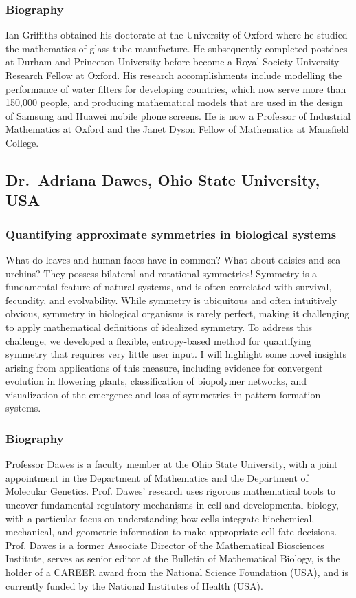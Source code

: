 \documentclass[12pt,a4paper]{article}
\begin{document}
\subsubsection{Biography}

Ian Griffiths obtained his doctorate at the University of Oxford where he studied the mathematics of glass tube manufacture. He subsequently completed postdocs at Durham and Princeton University before become a Royal Society University Research Fellow at Oxford. His research accomplishments include modelling the performance of water filters for developing countries, which now serve more than 150,000 people, and producing mathematical models that are used in the design of Samsung and Huawei mobile phone screens. He is now a Professor of Industrial Mathematics at Oxford and the Janet Dyson Fellow of Mathematics at Mansfield College.

\subsection{Dr.~Adriana Dawes, Ohio State University, USA}

\subsubsection{Quantifying approximate symmetries in biological systems}

What do leaves and human faces have in common? What about daisies and sea urchins? They possess bilateral and rotational symmetries! Symmetry is a fundamental feature of natural systems, and is often correlated with survival, fecundity, and evolvability. While symmetry is ubiquitous and often intuitively obvious, symmetry in biological organisms is rarely perfect, making it challenging to apply mathematical definitions of idealized symmetry. To address this challenge, we developed a flexible, entropy-based method for quantifying symmetry that requires very little user input. I will highlight some novel insights arising from applications of this measure, including evidence for convergent evolution in flowering plants, classification of biopolymer networks, and visualization of the emergence and loss of symmetries in pattern formation systems.

\subsubsection{Biography}

Professor Dawes is a faculty member at the Ohio State University, with a joint appointment in the Department of Mathematics and the Department of Molecular Genetics. Prof. Dawes' research uses rigorous mathematical tools to uncover fundamental regulatory mechanisms in cell and developmental biology, with a particular focus on understanding how cells integrate biochemical, mechanical, and geometric information to make appropriate cell fate decisions. Prof. Dawes is a former Associate Director of the Mathematical Biosciences Institute, serves as senior editor at the Bulletin of Mathematical Biology, is the holder of a CAREER award from the National Science Foundation (USA), and is currently funded by the National Institutes of Health (USA).
\end{document}
